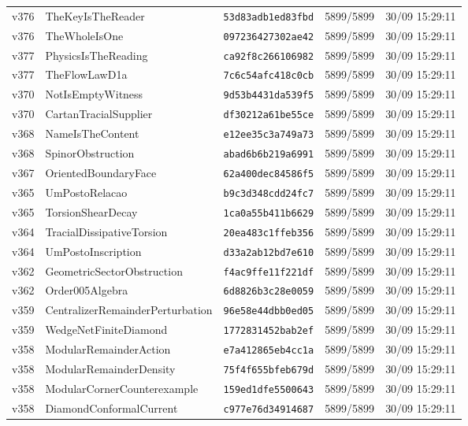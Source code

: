 \documentclass[11pt]{article}
\theoremstyle{definition}\newtheorem{deriv}{Derivation}
\begin{document}
{\begin{longtable}{@{}lllll@{}}
v376 & TheKeyIsTheReader & \texttt{53d83adb1ed83fbd} & 5899/5899 & 30/09 15:29:11 \\
v376 & TheWholeIsOne & \texttt{097236427302ae42} & 5899/5899 & 30/09 15:29:11 \\
v377 & PhysicsIsTheReading & \texttt{ca92f8c266106982} & 5899/5899 & 30/09 15:29:11 \\
v377 & TheFlowLawD1a & \texttt{7c6c54afc418c0cb} & 5899/5899 & 30/09 15:29:11 \\
v370 & NotIsEmptyWitness & \texttt{9d53b4431da539f5} & 5899/5899 & 30/09 15:29:11 \\
v370 & CartanTracialSupplier & \texttt{df30212a61be55ce} & 5899/5899 & 30/09 15:29:11 \\
v368 & NameIsTheContent & \texttt{e12ee35c3a749a73} & 5899/5899 & 30/09 15:29:11 \\
v368 & SpinorObstruction & \texttt{abad6b6b219a6991} & 5899/5899 & 30/09 15:29:11 \\
v367 & OrientedBoundaryFace & \texttt{62a400dec84586f5} & 5899/5899 & 30/09 15:29:11 \\
v365 & UmPostoRelacao & \texttt{b9c3d348cdd24fc7} & 5899/5899 & 30/09 15:29:11 \\
v365 & TorsionShearDecay & \texttt{1ca0a55b411b6629} & 5899/5899 & 30/09 15:29:11 \\
v364 & TracialDissipativeTorsion & \texttt{20ea483c1ffeb356} & 5899/5899 & 30/09 15:29:11 \\
v364 & UmPostoInscription & \texttt{d33a2ab12bd7e610} & 5899/5899 & 30/09 15:29:11 \\
v362 & GeometricSectorObstruction & \texttt{f4ac9ffe11f221df} & 5899/5899 & 30/09 15:29:11 \\
v362 & Order005Algebra & \texttt{6d8826b3c28e0059} & 5899/5899 & 30/09 15:29:11 \\
v359 & CentralizerRemainderPerturbation & \texttt{96e58e44dbb0ed05} & 5899/5899 & 30/09 15:29:11 \\
v359 & WedgeNetFiniteDiamond & \texttt{1772831452bab2ef} & 5899/5899 & 30/09 15:29:11 \\
v358 & ModularRemainderAction & \texttt{e7a412865eb4cc1a} & 5899/5899 & 30/09 15:29:11 \\
v358 & ModularRemainderDensity & \texttt{75f4f655bfeb679d} & 5899/5899 & 30/09 15:29:11 \\
v358 & ModularCornerCounterexample & \texttt{159ed1dfe5500643} & 5899/5899 & 30/09 15:29:11 \\
v358 & DiamondConformalCurrent & \texttt{c977e76d34914687} & 5899/5899 & 30/09 15:29:11 \\

\end{longtable}}
\end{document}
